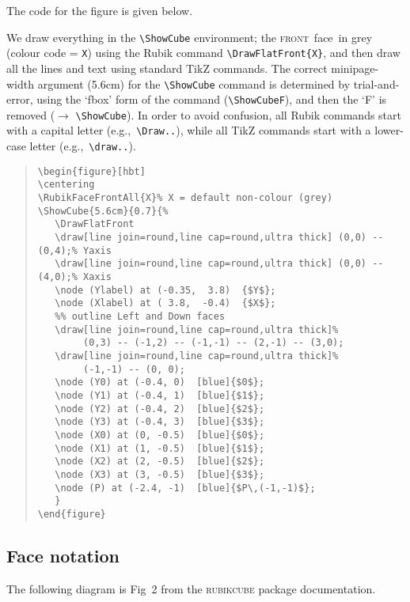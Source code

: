 \documentclass[a4paper]{article}
\newcommand{\frontface}{\textsc{front}\ face}
\begin{document}
{\noindent}The code for the figure is given below.

We  draw everything in the  \verb!\ShowCube! environment; the \frontface\  
in grey (colour code = \texttt{X}) using the Rubik command 
\verb!\DrawFlatFront{X}!, and then draw all the lines and text using standard 
TikZ commands. The correct  minipage-width argument (5.6cm) for the 
\verb!\ShowCube! command is determined by trial-and-error, using the `fbox' 
form of the command (\verb!\ShowCubeF!), and then the `F' is removed 
($\rightarrow$ \verb!\ShowCube!). In order to avoid confusion, all Rubik commands 
start with a capital letter (e.g.,~\verb!\Draw..!), while all TikZ commands 
start with a lower-case letter (e.g.,~\verb!\draw..!).

\begin{quote}
\begin{verbatim}
\begin{figure}[hbt]
\centering
\RubikFaceFrontAll{X}% X = default non-colour (grey)
\ShowCube{5.6cm}{0.7}{%
   \DrawFlatFront
   \draw[line join=round,line cap=round,ultra thick] (0,0) -- (0,4);% Yaxis
   \draw[line join=round,line cap=round,ultra thick] (0,0) -- (4,0);% Xaxis
   \node (Ylabel) at (-0.35,  3.8)  {$Y$};
   \node (Xlabel) at ( 3.8,  -0.4)  {$X$};
   %% outline Left and Down faces
   \draw[line join=round,line cap=round,ultra thick]%
        (0,3) -- (-1,2) -- (-1,-1) -- (2,-1) -- (3,0);
   \draw[line join=round,line cap=round,ultra thick]%
        (-1,-1) -- (0, 0);
   \node (Y0) at (-0.4, 0)  [blue]{$0$};
   \node (Y1) at (-0.4, 1)  [blue]{$1$};
   \node (Y2) at (-0.4, 2)  [blue]{$2$};
   \node (Y3) at (-0.4, 3)  [blue]{$3$};
   \node (X0) at (0, -0.5)  [blue]{$0$};
   \node (X1) at (1, -0.5)  [blue]{$1$};
   \node (X2) at (2, -0.5)  [blue]{$2$};
   \node (X3) at (3, -0.5)  [blue]{$3$};
   \node (P) at (-2.4, -1)  [blue]{$P\,(-1,-1)$};
   }
\end{figure}
\end{verbatim} 
\end{quote}




\pagebreak
\subsection{Face notation}



The following diagram  is Fig~2 from the \textsc{rubikcube} package documentation.
\end{document}
